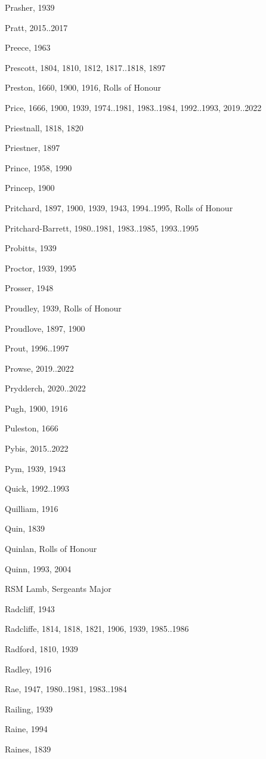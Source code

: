 {\begin{theindex}
\item Prasher, 1939
\item Pratt, 2015..2017
\item Preece, 1963
\item Prescott, 1804, 1810, 1812, 1817..1818, 1897
\item Preston, 1660, 1900, 1916, Rolls of Honour
\item Price, 1666, 1900, 1939, 1974..1981, 1983..1984, 1992..1993, 2019..2022
\item Priestnall, 1818, 1820
\item Priestner, 1897
\item Prince, 1958, 1990
\item Princep, 1900
\item Pritchard, 1897, 1900, 1939, 1943, 1994..1995, Rolls of Honour
\item Pritchard-Barrett, 1980..1981, 1983..1985, 1993..1995
\item Probitts, 1939
\item Proctor, 1939, 1995
\item Prosser, 1948
\item Proudley, 1939, Rolls of Honour
\item Proudlove, 1897, 1900
\item Prout, 1996..1997
\item Prowse, 2019..2022
\item Prydderch, 2020..2022
\item Pugh, 1900, 1916
\item Puleston, 1666
\item Pybis, 2015..2022
\item Pym, 1939, 1943
\item Quick, 1992..1993
\item Quilliam, 1916
\item Quin, 1839
\item Quinlan, Rolls of Honour
\item Quinn, 1993, 2004
\item RSM Lamb, Sergeants Major
\item Radcliff, 1943
\item Radcliffe, 1814, 1818, 1821, 1906, 1939, 1985..1986
\item Radford, 1810, 1939
\item Radley, 1916
\item Rae, 1947, 1980..1981, 1983..1984
\item Railing, 1939
\item Raine, 1994
\item Raines, 1839

\end{theindex}}
